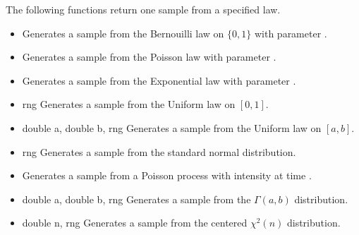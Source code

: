 The following functions return one sample from a specified law.
\begin{itemize}
\item {}
  \sshortdescribe Generates a sample from the Bernouilli law on $\{0, 1\}$ with
  parameter .

\item {}
  \sshortdescribe Generates a sample from the Poisson law with
  parameter .

\item {}
  \sshortdescribe Generates a sample from the Exponential law with
  parameter .

\item {} { \ptr rng}
  \sshortdescribe Generates a sample from the Uniform law on $[0, 1]$.

\item {} {double a, double b,
     \ptr rng}
  \sshortdescribe Generates a sample from the Uniform law on $[a, b]$.

\item {} { \ptr rng}
  \sshortdescribe Generates a sample from the standard normal distribution.

\item {}
  \sshortdescribe Generates a sample from a Poisson process with intensity
   at time .

\item {} {double a, double b,  \ptr rng}
  \sshortdescribe Generates a sample from the $\Gamma(a, b)$ distribution.

\item {} {double n,  \ptr rng}
  \sshortdescribe Generates a sample from the centered $\chi^2(n)$ distribution.
\end{itemize}

